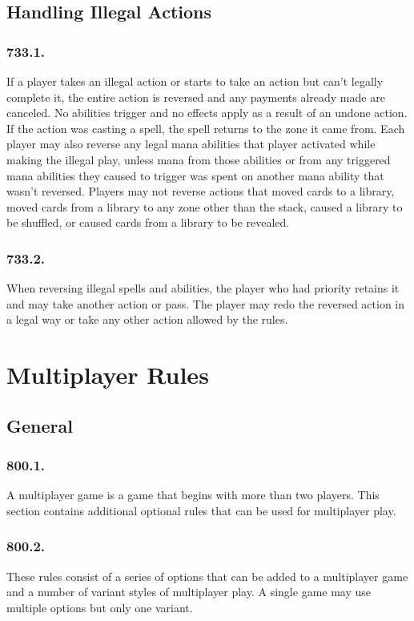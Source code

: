 \section{Handling Illegal Actions}
\subsection*{733.1.}
If a player takes an illegal action or starts to take an action but can’t legally complete it, the entire action is reversed and any payments already made are canceled. No abilities trigger and no effects apply as a result of an undone action. If the action was casting a spell, the spell returns to the zone it came from. Each player may also reverse any legal mana abilities that player activated while making the illegal play, unless mana from those abilities or from any triggered mana abilities they caused to trigger was spent on another mana ability that wasn’t reversed. Players may not reverse actions that moved cards to a library, moved cards from a library to any zone other than the stack, caused a library to be shuffled, or caused cards from a library to be revealed.

\subsection*{733.2.}
When reversing illegal spells and abilities, the player who had priority retains it and may take another action or pass. The player may redo the reversed action in a legal way or take any other action allowed by the rules.

\chapter{Multiplayer Rules}
\setcounter{section}{799}
\section{General}
\subsection*{800.1.}
A multiplayer game is a game that begins with more than two players. This section contains additional optional rules that can be used for multiplayer play.

\subsection*{800.2.}
These rules consist of a series of options that can be added to a multiplayer game and a number of variant styles of multiplayer play. A single game may use multiple options but only one variant.

